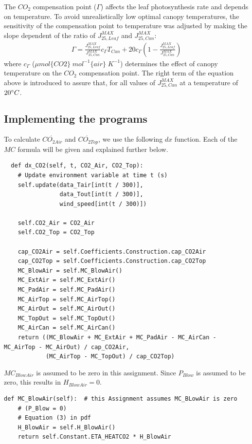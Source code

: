 \documentclass[a4paper]{article}
\begin{document}
The \(CO_2\) compensation point (\(\Gamma\)) affects the leaf photosynthesis rate and depends on temperature. To avoid unrealistically low optimal canopy temperatures, the sensitivity of the compensation point to temperature was adjusted by making the slope dependent of the ratio of \(J^{MAX}_{25,Leaf}\) and \(J^{MAX}_{25,Can}\):
\begin{align}
  \Gamma = \frac{J^{MAX}_{25,Leaf}}{J^{MAX}_{25,Can}}c_{\Gamma} T_{Can} + 20 c_{\Gamma} \left(1-\frac{J^{MAX}_{25,Leaf}}{J^{MAX}_{25,Can}}\right)
\end{align}
where \(c_{\Gamma}\) (\(\mu mol\{CO2\}\;mol^{-1}\{air\}\;K^{-1}\)) determines the effect of canopy temperature on the \(CO_2\) compensation point. The right term of the equation above is introduced to assure that, for all values of \(J^{MAX}_{25,Can}\) at a temperature of \(20 \degree C\).

\newpage
\subsection{Implementing the programs}
To calculate \(\dot{CO_{2 Air}}\) and \(\dot{CO_{2 Top}}\), we use the following \(dx\) function. Each of the \(MC\) formula will be given and explained further below.

\begin{mdframed}[leftline=false,rightline=false,backgroundcolor=magenta!10]
  \begin{verbatim}
  def dx_CO2(self, t, CO2_Air, CO2_Top):
    # Update environment variable at time t (s)
    self.update(data_Tair[int(t / 300)],
                data_Tout[int(t / 300)],
                wind_speed[int(t / 300)])

    self.CO2_Air = CO2_Air
    self.CO2_Top = CO2_Top

    cap_CO2Air = self.Coefficients.Construction.cap_CO2Air
    cap_CO2Top = self.Coefficients.Construction.cap_CO2Top
    MC_BlowAir = self.MC_BlowAir()
    MC_ExtAir = self.MC_ExtAir()
    MC_PadAir = self.MC_PadAir()
    MC_AirTop = self.MC_AirTop()
    MC_AirOut = self.MC_AirOut()
    MC_TopOut = self.MC_TopOut()
    MC_AirCan = self.MC_AirCan()
    return ((MC_BlowAir + MC_ExtAir + MC_PadAir - MC_AirCan - MC_AirTop - MC_AirOut) / cap_CO2Air,
            (MC_AirTop - MC_TopOut) / cap_CO2Top)
  \end{verbatim}
\end{mdframed}

\(MC_{BlowAir}\) is assumed to be zero in this assignment.
Since \(P_{Blow}\) is assumed to be zero, this results in \(H_{BlowAir} = 0\).
\begin{mdframed}[leftline=false,rightline=false,backgroundcolor=magenta!10]
  \begin{verbatim}
def MC_BlowAir(self):  # this Assignment assumes MC_BLowAir is zero
    # (P_Blow = 0)
    # Equation (3) in pdf
    H_BlowAir = self.H_BlowAir()
    return self.Constant.ETA_HEATCO2 * H_BlowAir
  \end{verbatim}
\end{mdframed}
\end{document}
